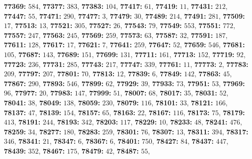 \textsf{\bfseries 77369:} $584$, \textsf{\bfseries 77377:} $383$, \textsf{\bfseries 77383:} $104$, \textsf{\bfseries 77417:} $61$, \textsf{\bfseries 77419:} $11$, \textsf{\bfseries 77431:} $212$, \textsf{\bfseries 77447:} $55$, \textsf{\bfseries 77471:} $290$, \textsf{\bfseries 77477:} $3$, \textsf{\bfseries 77479:} $30$, \textsf{\bfseries 77489:} $214$, \textsf{\bfseries 77491:} $281$, \textsf{\bfseries 77509:} $17$, \textsf{\bfseries 77513:} $13$, \textsf{\bfseries 77521:} $305$, \textsf{\bfseries 77527:} $26$, \textsf{\bfseries 77543:} $79$, \textsf{\bfseries 77549:} $553$, \textsf{\bfseries 77551:} $772$, \textsf{\bfseries 77557:} $247$, \textsf{\bfseries 77563:} $245$, \textsf{\bfseries 77569:} $259$, \textsf{\bfseries 77573:} $63$, \textsf{\bfseries 77587:} $32$, \textsf{\bfseries 77591:} $187$, \textsf{\bfseries 77611:} $128$, \textsf{\bfseries 77617:} $17$, \textsf{\bfseries 77621:} $7$, \textsf{\bfseries 77641:} $259$, \textsf{\bfseries 77647:} $52$, \textsf{\bfseries 77659:} $546$, \textsf{\bfseries 77681:} $105$, \textsf{\bfseries 77687:} $143$, \textsf{\bfseries 77689:} $151$, \textsf{\bfseries 77699:} $131$, \textsf{\bfseries 77711:} $161$, \textsf{\bfseries 77713:} $152$, \textsf{\bfseries 77719:} $92$, \textsf{\bfseries 77723:} $236$, \textsf{\bfseries 77731:} $285$, \textsf{\bfseries 77743:} $217$, \textsf{\bfseries 77747:} $339$, \textsf{\bfseries 77761:} $11$, \textsf{\bfseries 77773:} $2$, \textsf{\bfseries 77783:} $209$, \textsf{\bfseries 77797:} $207$, \textsf{\bfseries 77801:} $70$, \textsf{\bfseries 77813:} $12$, \textsf{\bfseries 77839:} $6$, \textsf{\bfseries 77849:} $142$, \textsf{\bfseries 77863:} $45$, \textsf{\bfseries 77867:} $290$, \textsf{\bfseries 77893:} $546$, \textsf{\bfseries 77899:} $62$, \textsf{\bfseries 77929:} $39$, \textsf{\bfseries 77933:} $73$, \textsf{\bfseries 77951:} $53$, \textsf{\bfseries 77969:} $96$, \textsf{\bfseries 77977:} $20$, \textsf{\bfseries 77983:} $147$, \textsf{\bfseries 77999:} $51$, \textsf{\bfseries 78007:} $68$, \textsf{\bfseries 78017:} $35$, \textsf{\bfseries 78031:} $52$, \textsf{\bfseries 78041:} $38$, \textsf{\bfseries 78049:} $138$, \textsf{\bfseries 78059:} $230$, \textsf{\bfseries 78079:} $116$, \textsf{\bfseries 78101:} $33$, \textsf{\bfseries 78121:} $166$, \textsf{\bfseries 78137:} $47$, \textsf{\bfseries 78139:} $154$, \textsf{\bfseries 78157:} $65$, \textsf{\bfseries 78163:} $22$, \textsf{\bfseries 78167:} $116$, \textsf{\bfseries 78173:} $75$, \textsf{\bfseries 78179:} $413$, \textsf{\bfseries 78191:} $244$, \textsf{\bfseries 78193:} $342$, \textsf{\bfseries 78203:} $117$, \textsf{\bfseries 78229:} $10$, \textsf{\bfseries 78233:} $48$, \textsf{\bfseries 78241:} $476$, \textsf{\bfseries 78259:} $34$, \textsf{\bfseries 78277:} $180$, \textsf{\bfseries 78283:} $259$, \textsf{\bfseries 78301:} $76$, \textsf{\bfseries 78307:} $13$, \textsf{\bfseries 78311:} $394$, \textsf{\bfseries 78317:} $346$, \textsf{\bfseries 78341:} $21$, \textsf{\bfseries 78347:} $6$, \textsf{\bfseries 78367:} $6$, \textsf{\bfseries 78401:} $750$, \textsf{\bfseries 78427:} $84$, \textsf{\bfseries 78437:} $447$, \textsf{\bfseries 78439:} $352$, \textsf{\bfseries 78467:} $175$, \textsf{\bfseries 78479:} $42$, \textsf{\bfseries 78487:} $55$, 
